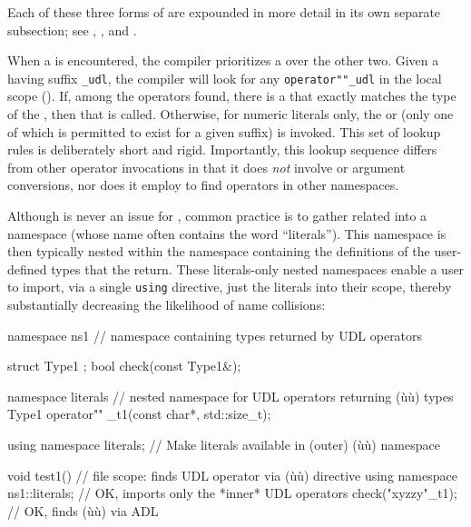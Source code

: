 Each of these three forms of  are expounded in more detail in its own separate subsection; see , , and .

When a  is encountered, the compiler prioritizes a
 over the other two. Given a
 having suffix \lstinline!_udl!, the compiler will look for
any \lstinline!operator""_udl! in the local scope (). If, among the operators found, there is a
 that exactly matches the type of
the , then that  is called.
Otherwise, for numeric literals only, the  or
 (only one of which is permitted to exist
for a given suffix) is invoked. This set of lookup rules is deliberately
short and rigid. Importantly, this lookup sequence differs from other
operator invocations in that it does \emph{not} involve  or argument conversions, nor does it employ
 to find operators in
other namespaces.

Although  is never an issue for , common
practice is to gather related  into a namespace
(whose name often contains the word ``literals''). This namespace is
then typically nested within the namespace containing the definitions of
the user-defined types that the  return. These
literals-only nested namespaces enable a user to import, via a single
\lstinline!using! directive, just the literals into their scope, thereby
substantially decreasing the likelihood of name collisions:

\begin{emcppslisting}
namespace ns1  // namespace containing types returned by UDL operators
{
    struct Type1 { };
    bool check(const Type1&);

    namespace literals  // nested namespace for UDL operators returning (ù{}ù) types
    {
        Type1 operator"" _t1(const char*, std::size_t);
    }

    using namespace literals;  // Make literals available in (outer) (ù{}ù) namespace
}

void test1()  // file scope: finds UDL operator via (ù{}ù) directive
{
    using namespace ns1::literals;  // OK, imports only the *inner* UDL operators
    check("xyzzy"_t1);              // OK, finds (ù{}ù) via ADL
}
\end{emcppslisting}
    
